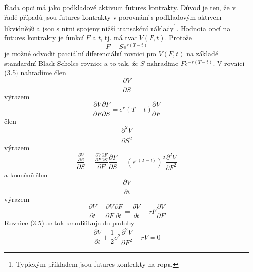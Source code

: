 \documentclass[a4paper]{book}
\begin{document}
Řada opcí má jako podkladové aktivum futures kontrakty. Důvod je ten, že v řadě případů jsou futures kontrakty v porovnání s podkladovým aktivem likvidnější a jsou s nimi spojeny nižší transakční náklady\footnote{Typickým příkladem jsou futures kontrakty na ropu.}. Hodnota opcí na futures kontrakty je funkcí $F$ a $t$, tj. má tvar $V(F,t)$. Protože
\begin{equation*}
F = Se^{r(T - t)}
\end{equation*}
je možné odvodit parciální diferenciální rovnici pro $V(F,t)$ na základě standardní Black-Scholes rovnice a to tak, že $S$ nahradíme $Fe^{-r(T - t)}$. V rovnici (3.5) nahradíme člen
\begin{equation*}
\frac{\partial V}{\partial S}
\end{equation*}
výrazem
\begin{equation*}
\frac{\partial V}{\partial F}\frac{\partial F}{\partial S} = e^r(T - t)\frac{\partial V}{\partial F}
\end{equation*}
člen
\begin{equation*}
\frac{\partial^2 V}{\partial S^2}
\end{equation*}
výrazem
\begin{equation*}
\frac{\frac{\partial V}{\partial S}}{\partial S} = \frac{\frac{\partial V}{\partial F}\frac{\partial F}{\partial S}}{\partial F}\frac{\partial F}{\partial S} = (e^{r(T - t)})^2 \frac{\partial^2 V}{\partial F^2}
\end{equation*}
a konečně člen
\begin{equation*}
\frac{\partial V}{\partial t}
\end{equation*}
výrazem
\begin{equation*}
\frac{\partial V}{\partial t} + \frac{\partial V}{\partial F}\frac{\partial F}{\partial t} = \frac{\partial V}{\partial t} - rF\frac{\partial V}{\partial F}
\end{equation*}
Rovnice (3.5) se tak zmodifikuje do podoby
\begin{equation}
\frac{\partial V}{\partial t} + \frac{1}{2}\sigma^2\frac{\partial^2 V}{\partial F^2} - rV = 0
\end{equation}
\end{document}
